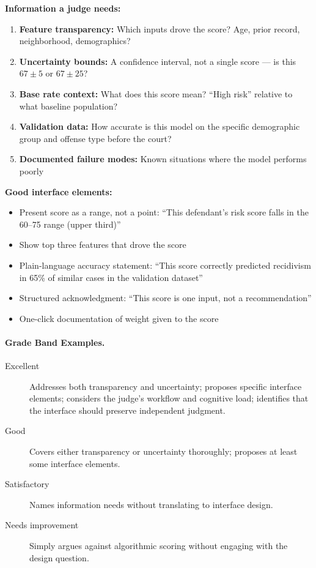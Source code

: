 \textbf{Information a judge needs:}
\begin{enumerate}
    \item \textbf{Feature transparency:} Which inputs drove the score? Age, prior record, neighborhood, demographics?
    \item \textbf{Uncertainty bounds:} A confidence interval, not a single score --- is this $67 \pm 5$ or $67 \pm 25$?
    \item \textbf{Base rate context:} What does this score mean? ``High risk'' relative to what baseline population?
    \item \textbf{Validation data:} How accurate is this model on the specific demographic group and offense type before the court?
    \item \textbf{Documented failure modes:} Known situations where the model performs poorly
\end{enumerate}

\textbf{Good interface elements:}
\begin{itemize}
    \item Present score as a range, not a point: ``This defendant's risk score falls in the 60--75 range (upper third)''
    \item Show top three features that drove the score
    \item Plain-language accuracy statement: ``This score correctly predicted recidivism in 65\% of similar cases in the validation dataset''
    \item Structured acknowledgment: ``This score is one input, not a recommendation''
    \item One-click documentation of weight given to the score
\end{itemize}

\paragraph{Grade Band Examples.}

\begin{description}
    \item[Excellent] Addresses both transparency and uncertainty; proposes specific interface elements; considers the judge's workflow and cognitive load; identifies that the interface should preserve independent judgment.

    \item[Good] Covers either transparency or uncertainty thoroughly; proposes at least some interface elements.

    \item[Satisfactory] Names information needs without translating to interface design.

    \item[Needs improvement] Simply argues against algorithmic scoring without engaging with the design question.
\end{description}

